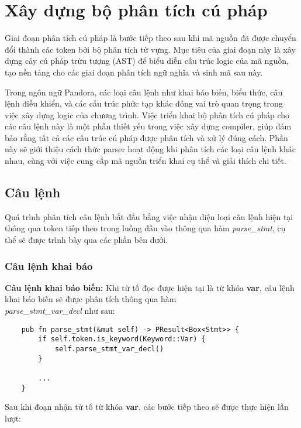 \section{Xây dựng bộ phân tích cú pháp}
Giai đoạn phân tích cú pháp là bước tiếp theo sau khi mã nguồn đã được chuyển đổi thành các token bởi bộ phân tích từ vựng. Mục tiêu của giai đoạn này là xây dựng cây cú pháp trừu tượng (AST) để biểu diễn cấu trúc logic của mã nguồn, tạo nền tảng cho các giai đoạn phân tích ngữ nghĩa và sinh mã sau này. 

Trong ngôn ngữ Pandora, các loại câu lệnh như khai báo biến, biểu thức, câu lệnh điều khiển, và các cấu trúc phức tạp khác đóng vai trò quan trọng trong việc xây dựng logic của chương trình. Việc triển khai bộ phân tích cú pháp cho các câu lệnh này là một phần thiết yếu trong việc xây dựng compiler, giúp đảm bảo rằng tất cả các cấu trúc cú pháp được phân tích và xử lý đúng cách. Phần này sẽ giới thiệu cách thức parser hoạt động khi phân tích các loại câu lệnh khác nhau, cùng với việc cung cấp mã nguồn triển khai cụ thể và giải thích chi tiết.

\subsection{Câu lệnh}
Quá trình phân tích câu lệnh bắt đầu bằng việc nhận diện loại câu lệnh hiện tại thông qua token tiếp theo trong luồng đầu vào thông qua hàm \textit{parse\_stmt}, cụ thể sẽ được trình bày qua các phần bên dưới.
\subsubsection{Câu lệnh khai báo}
\textbf{Câu lệnh khai báo biến:}
Khi từ tố đọc được hiện tại là từ khóa \textbf{var}, câu lệnh khai báo biến sẽ được phân tích thông qua hàm \\\textit{parse\_stmt\_var\_decl} như sau:

\begin{lstlisting}
    pub fn parse_stmt(&mut self) -> PResult<Box<Stmt>> {
        if self.token.is_keyword(Keyword::Var) {
            self.parse_stmt_var_decl()
        } 

        ...
    }
\end{lstlisting}

Sau khi đoạn nhận từ tố từ khóa \textbf{var}, các bước tiếp theo sẽ được thực hiện lần lượt:

